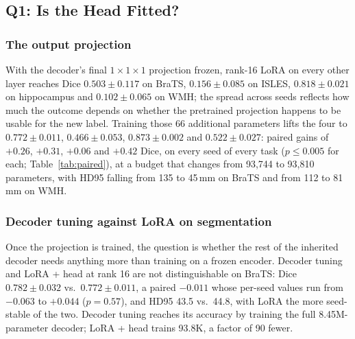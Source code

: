 \iffull\documentclass[journal]{IEEEtran}\else\documentclass[journal,twoside,web]{ieeecolor}\usepackage{generic}\fi
\begin{document}
\subsection{Q1: Is the Head Fitted?}
\label{sec:res_q1}

\subsubsection{The output projection}
\label{sec:res_head}

With the decoder's final $1{\times}1{\times}1$ projection frozen, rank-16 LoRA on every other layer reaches Dice $0.503\pm0.117$ on BraTS, $0.156\pm0.085$ on ISLES, $0.818\pm0.021$ on hippocampus and $0.102\pm0.065$ on WMH; the spread across seeds reflects how much the outcome depends on whether the pretrained projection happens to be usable for the new label. Training those 66 additional parameters lifts the four to $0.772\pm0.011$, $0.466\pm0.053$, $0.873\pm0.002$ and $0.522\pm0.027$: paired gains of $+0.26$, $+0.31$, $+0.06$ and $+0.42$ Dice, on every seed of every task ($p\le0.005$ for each; Table~\ref{tab:paired}), at a budget that changes from 93,744 to 93,810 parameters, with HD95 falling from 135 to 45\,mm on BraTS and from 112 to 81\,mm on WMH. 

\subsubsection{Decoder tuning against LoRA on segmentation}
\label{sec:res_rank}

Once the projection is trained, the question is whether the rest of the inherited decoder needs anything more than training on a frozen encoder. Decoder tuning and LoRA + head at rank 16 are not distinguishable on BraTS: Dice $0.782\pm0.032$ vs.\ $0.772\pm0.011$, a paired $-0.011$ whose per-seed values run from $-0.063$ to $+0.044$ ($p=0.57$), and HD95 43.5 vs.\ 44.8, with LoRA the more seed-stable of the two. Decoder tuning reaches its accuracy by training the full 8.45M-parameter decoder; LoRA + head trains 93.8K, a factor of 90 fewer.
\end{document}
